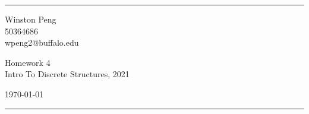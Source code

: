 \documentclass[a4paper]{article}
\begin{document}

\fancyhead[C]{}
\hrule \medskip %
\begin{minipage}{0.295\textwidth} 
\raggedright
\footnotesize
Winston Peng \hfill\\   
50364686 \hfill\\
wpeng2@buffalo.edu
\end{minipage}
\begin{minipage}{0.4\textwidth} 
\centering 
\large 
Homework 4\\ 
\normalsize 
Intro To Discrete Structures, 2021\\ 
\end{minipage}
\begin{minipage}{0.295\textwidth} 
\raggedleft
\today\hfill\\
\end{minipage}
\medskip\hrule 
\bigskip %
\end{document}
